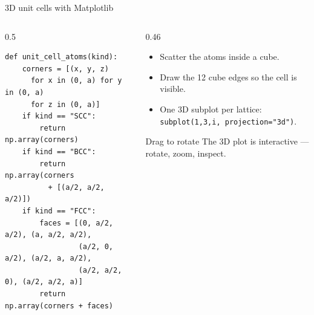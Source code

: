 \documentclass[aspectratio=169]{beamer}
\begin{document}
\begin{frame}[fragile]{3D unit cells with Matplotlib}
  \begin{columns}[T]
    \begin{column}{0.5\textwidth}
      \begin{lstlisting}[basicstyle=\ttfamily\scriptsize]
def unit_cell_atoms(kind):
    corners = [(x, y, z)
      for x in (0, a) for y in (0, a)
      for z in (0, a)]
    if kind == "SCC":
        return np.array(corners)
    if kind == "BCC":
        return np.array(corners
          + [(a/2, a/2, a/2)])
    if kind == "FCC":
        faces = [(0, a/2, a/2), (a, a/2, a/2),
                 (a/2, 0, a/2), (a/2, a, a/2),
                 (a/2, a/2, 0), (a/2, a/2, a)]
        return np.array(corners + faces)
      \end{lstlisting}
    \end{column}
    \begin{column}{0.46\textwidth}
      \begin{itemize}
        \item Scatter the atoms inside a cube.
        \item Draw the 12 cube edges so the cell is visible.
        \item One 3D subplot per lattice: \texttt{subplot(1,3,i, projection="3d")}.
      \end{itemize}
      \vspace{0.2cm}
      \begin{alertblock}{ Drag to rotate}
        The 3D plot is interactive --- rotate, zoom, inspect.
      \end{alertblock}
    \end{column}
  \end{columns}
\end{frame}
\end{document}
